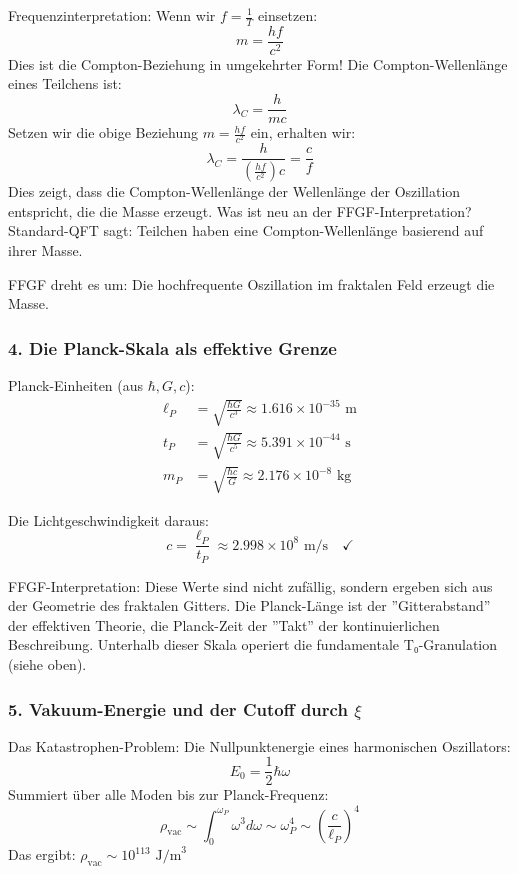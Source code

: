 \documentclass[12pt,a4paper]{article}
\begin{document}
	Frequenzinterpretation:
	Wenn wir \( f = \frac{1}{T} \) einsetzen:
	\[
	m = \frac{hf}{c^2}
	\]
	Dies ist die Compton-Beziehung in umgekehrter Form! Die Compton-Wellenlänge eines Teilchens ist:
	\[
	\lambda_C = \frac{h}{mc}
	\]
	Setzen wir die obige Beziehung \( m = \frac{hf}{c^2} \) ein, erhalten wir:
	\[
	\lambda_C = \frac{h}{\left(\frac{hf}{c^2}\right)c} = \frac{c}{f}
	\]
	Dies zeigt, dass die Compton-Wellenlänge der Wellenlänge der Oszillation entspricht, die die Masse erzeugt.
	Was ist neu an der FFGF-Interpretation?
	Standard-QFT sagt: Teilchen haben eine Compton-Wellenlänge basierend auf ihrer Masse.
	
	FFGF dreht es um: Die hochfrequente Oszillation im fraktalen Feld erzeugt die Masse.
	
	\subsubsection{4. Die Planck-Skala als effektive Grenze}
	Planck-Einheiten (aus \( \hbar, G, c \)):
	\begin{align}
		\ell_P &= \sqrt{\frac{\hbar G}{c^3}} \approx 1.616 \times 10^{-35} \text{ m} \\
		t_P &= \sqrt{\frac{\hbar G}{c^5}} \approx 5.391 \times 10^{-44} \text{ s} \\
		m_P &= \sqrt{\frac{\hbar c}{G}} \approx 2.176 \times 10^{-8} \text{ kg}
	\end{align}
	
	Die Lichtgeschwindigkeit daraus:
	\[
	c = \frac{\ell_P}{t_P} \approx 2.998 \times 10^8 \text{ m/s} \quad \checkmark
	\]
	
	FFGF-Interpretation:
	Diese Werte sind nicht zufällig, sondern ergeben sich aus der Geometrie des fraktalen Gitters. Die Planck-Länge ist der ''Gitterabstand'' der effektiven Theorie, die Planck-Zeit der ''Takt'' der kontinuierlichen Beschreibung. Unterhalb dieser Skala operiert die fundamentale T₀-Granulation (siehe oben).
	
	\subsubsection{5. Vakuum-Energie und der Cutoff durch \( \xi \)}
	Das Katastrophen-Problem:
	Die Nullpunktenergie eines harmonischen Oszillators:
	\[
	E_0 = \frac{1}{2}\hbar\omega
	\]
	Summiert über alle Moden bis zur Planck-Frequenz:
	\[
	\rho_{\text{vac}} \sim \int_0^{\omega_P} \omega^3 d\omega \sim \omega_P^4 \sim \left(\frac{c}{\ell_P}\right)^4
	\]
	Das ergibt: \( \rho_{\text{vac}} \sim 10^{113} \text{ J/m}^3 \)
	
\end{document}
